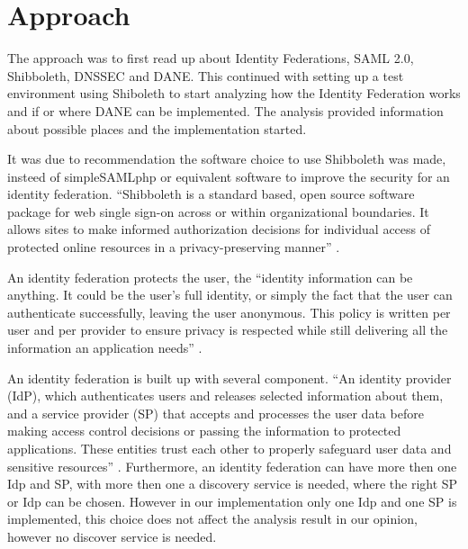 \section{Approach}

The approach was to first read up about Identity Federations, SAML 2.0, Shibboleth, DNSSEC and DANE. This continued with setting up a test environment using Shiboleth to start analyzing how the Identity Federation works and if or where DANE can be implemented. The analysis provided information about possible places and the implementation started.  

It was due to recommendation the software choice to use Shibboleth was made, insteed of simpleSAMLphp or equivalent software to improve the security for an identity federation. “Shibboleth is a standard based, open source software package for web single sign-on across or within organizational boundaries. It allows sites to make informed authorization decisions for individual access of protected online resources in a privacy-preserving manner” \cite[p.~startpage]{website:Shibboleth}.

An identity federation protects the user, the “identity information can be anything. It could be the user's full identity, or simply the fact that the user can authenticate successfully, leaving the user anonymous. This policy is written per user and per provider to ensure privacy is respected while still delivering all the information an application needs” \cite[p.~/HighLevelIntro.html]{website:Shibboleth}.

An identity federation is built up with several component. “An identity provider (IdP), which authenticates users and releases selected information about them, and a service provider (SP) that accepts and processes the user data before making access control decisions or passing the information to protected applications. These entities trust each other to properly safeguard user data and sensitive resources” \cite[p.~/HighLevelIntro.html]{website:Shibboleth}. Furthermore,  an identity federation can have more then one Idp and SP, with more then one a discovery service is needed, where the right SP or Idp can be chosen. However in our implementation only one Idp and one SP is implemented, this choice does not affect the analysis result in our opinion, however no discover service is needed. 



